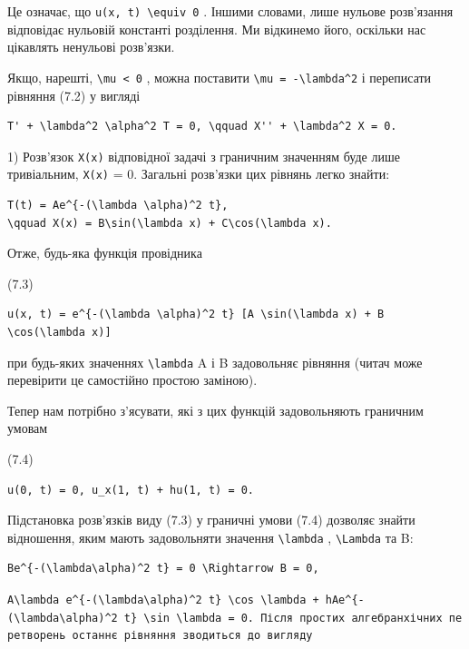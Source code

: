 \documentclass[
  ukrainian,
]{article}
\begin{document}
Це означає, що \texttt{u(x,\ t)\ \textbackslash{}equiv\ 0} . Іншими
словами, лише нульове розв'язання відповідає нульовій константі
розділення. Ми відкинемо його, оскільки нас цікавлять ненульові
розв'язки.

Якщо, нарешті, \texttt{\textbackslash{}mu\ \textless{}\ 0} , можна
поставити \texttt{\textbackslash{}mu\ =\ -\textbackslash{}lambda\^{}2} і
переписати рівняння (7.2) у вигляді

\begin{verbatim}
T' + \lambda^2 \alpha^2 T = 0, \qquad X'' + \lambda^2 X = 0.
\end{verbatim}

1) Розв'язок \texttt{X(x)} відповідної задачі з граничним значенням буде
лише тривіальним, \texttt{X(x)} = 0. Загальні розв'язки цих рівнянь
легко знайти:

\begin{verbatim}
T(t) = Ae^{-(\lambda \alpha)^2 t},
\qquad X(x) = B\sin(\lambda x) + C\cos(\lambda x).
\end{verbatim}

Отже, будь-яка функція провідника

(7.3)

\begin{verbatim}
u(x, t) = e^{-(\lambda \alpha)^2 t} [A \sin(\lambda x) + B \cos(\lambda x)]
\end{verbatim}

при будь-яких значеннях \texttt{\textbackslash{}lambda} A і B
задовольняє рівняння (читач може перевірити це самостійно простою
заміною).

Тепер нам потрібно з'ясувати, які з цих функцій задовольняють граничним
умовам

(7.4)

\begin{verbatim}
u(0, t) = 0, u_x(1, t) + hu(1, t) = 0.
\end{verbatim}

Підстановка розв'язків виду (7.3) у граничні умови (7.4) дозволяє знайти
відношення, яким мають задовольняти значення
\texttt{\textbackslash{}lambda} , \texttt{\textbackslash{}Lambda} та B:

\begin{verbatim}
Be^{-(\lambda\alpha)^2 t} = 0 \Rightarrow B = 0,
\end{verbatim}

\texttt{\textquotesingle{}A\textbackslash{}lambda\ e\^{}\{-(\textbackslash{}lambda\textbackslash{}alpha)\^{}2\ t\}\ \textbackslash{}cos\ \textbackslash{}lambda\ +\ hAe\^{}\{-(\textbackslash{}lambda\textbackslash{}alpha)\^{}2\ t\}\ \textbackslash{}sin\ \textbackslash{}lambda\ =\ 0.\textquotesingle{}\ Після\ простих\ алгебранхічних\ перетворень\ останнє\ рівняння\ зводиться\ до\ вигляду}
\end{document}
